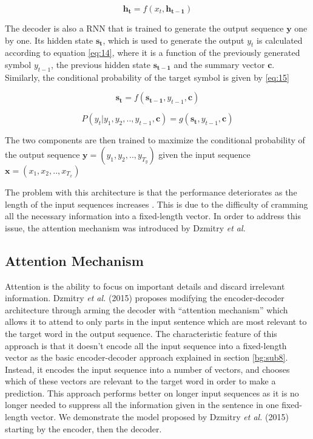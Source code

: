 \begin{equation}
\label{eq:13}
\mathbf{h_t} = f( x_t, \mathbf{h_{t-1}})
\end{equation}


The decoder is also a \ac{RNN} that is trained to generate the output sequence $ \mathbf{y}$ one by one. 
Its hidden state $ \mathbf{s_t}$, which is used to generate the output  $ y_t$ is calculated according to equation \ref{eq:14}, where it is a function of the previously generated symbol $y_{t-1}$, the previous hidden state $\mathbf{s_{t-1}}$ and the summary vector $\mathbf{c}$. Similarly, the conditional probability of the target symbol is given by \ref{eq:15}

\begin{equation}
\label{eq:14}
\mathbf{s_t} = f(\mathbf{s_{t-1}}, y_{t-1}, \mathbf{c})
\end{equation}

\begin{equation}
\label{eq:15}
P(y_t | y_1, y_2,.., y_{t-1}, \mathbf{c}) = g(\mathbf{s_{t}}, y_{t-1}, \mathbf{c})
\end{equation}

The two components are then trained to maximize the conditional probability of the output sequence $\mathbf{y}=(y_1,y_2,..,y_{T_y})$ given the input sequence $ \mathbf{x}=(x_1,x_2,..,x_{T_x})$


The problem with this architecture is that the performance deteriorates as the length of the input sequences increases \cite{cho2014properties}. This is due to the difficulty of cramming all the necessary information into a fixed-length vector. In order to address this issue, the attention mechanism was introduced by Dzmitry \textit{et al.} \cite{bahdanau2014neural}


\subsection{Attention Mechanism} 
\label{bg:sub10}

Attention is the ability to focus on important details and discard irrelevant information. Dzmitry \textit{et al.} (2015) \cite{bahdanau2014neural} proposes modifying the encoder-decoder architecture through arming the decoder with \enquote{attention mechanism} which allows it to attend to only parts in the input sentence which are most relevant to the target word in the output sequence. The characteristic feature of this approach is that it doesn't encode all the input sequence into a fixed-length vector as the basic encoder-decoder approach explained in section \ref{bg:sub8}. Instead, it encodes the input sequence into a number of vectors, and chooses which of these vectors are relevant to the target word in order to make a prediction. This approach performs better on longer input sequences as it is no longer needed to suppress all the information given in the sentence in one fixed-length vector. We demonstrate the model proposed by Dzmitry \textit{et al.} (2015) \cite{bahdanau2014neural} starting by the encoder, then the decoder.

